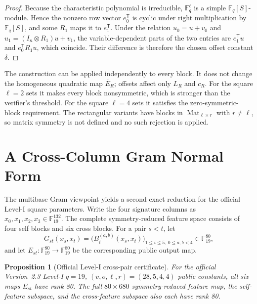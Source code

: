 \documentclass[11pt]{article}
\newtheorem{proposition}[theorem]{Proposition}
\newcommand{\F}{\mathbb F}
\newcommand{\Mat}{\operatorname{Mat}}
\newcommand{\transpose}{\mathsf T}
\begin{document}
\begin{proof}
Because the characteristic polynomial is irreducible, $\F_q^\ell$ is a simple $\F_q[S]$-module.  Hence the nonzero row vector $e_0^\transpose$ is cyclic under right multiplication by $\F_q[S]$, and some $R_1$ maps it to $e_1^\transpose$.  Under the relation $u_0=u+v_0$ and $u_1=(I_n\otimes R_1)u+v_1$, the variable-dependent parts of the two entries are $e_1^\transpose u$ and $e_0^\transpose R_1u$, which coincide.  Their difference is therefore the chosen offset constant $\delta$.
\end{proof}

The construction can be applied independently to every block.  It does not change the homogeneous quadratic map $\overline E_R$; offsets affect only $L_R$ and $c_R$.  For the square $\ell=2$ sets it makes every block nonsymmetric, which is stronger than the verifier's threshold.  For the square $\ell=4$ sets it satisfies the zero-symmetric-block requirement.  The rectangular variants have blocks in $\Mat_{\ell\times r}$ with $r\ne\ell$, so matrix symmetry is not defined and no such rejection is applied.

\section{A Cross-Column Gram Normal Form}\label{sec:crossnormal}

The multibase Gram viewpoint yields a second exact reduction for the official Level-I square parameters.  Write the four signature columns as $x_0,x_1,x_2,x_3\in\F_{19}^{132}$.  The complete symmetry-reduced feature space consists of four self blocks and six cross blocks.  For a pair $s<t$, let
\[
 G_{st}(x_s,x_t)
 =\bigl(B_i^{(a,b)}(x_s,x_t)\bigr)_{1\le i\le5,\ 0\le a,b<4}
 \in\F_{19}^{80},
\]
and let $E_{st}:\F_{19}^{80}\to\F_{19}^{80}$ be the corresponding public output map.

\begin{proposition}[Official Level-I cross-pair certificate]\label{prop:crosspair}
For the official Version~2.3 Level-I $q=19$, $(v,o,\ell,r)=(28,5,4,4)$ public constants, all six maps $E_{st}$ have rank 80.  The full $80\times680$ symmetry-reduced feature map, the self-feature subspace, and the cross-feature subspace also each have rank 80.
\end{proposition}
\end{document}

